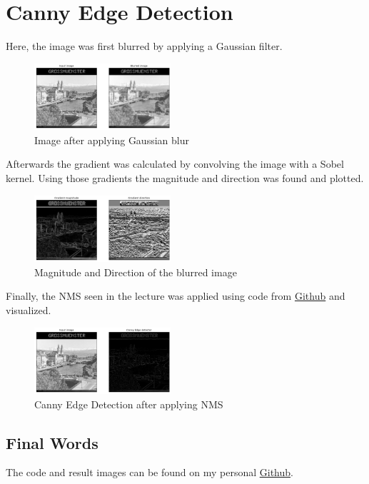 \documentclass{article}
\begin{document}
    \pagebreak

    \section{Canny Edge Detection}

    Here, the image was first blurred by applying a Gaussian filter.

    \begin{figure}[H]
        \centering
        \includegraphics[width = 0.45\textwidth]{canny_blur.png}
        \caption{Image after applying Gaussian blur}
        \label{img:canny_blur}
    \end{figure}

    Afterwards the gradient was calculated by convolving the image with a Sobel kernel.
    Using those gradients the magnitude and direction was found and plotted.

    \begin{figure}[H]
        \centering
        \includegraphics[width = 0.45\textwidth]{canny_magdir.png}
        \caption{Magnitude and Direction of the blurred image}
        \label{img:canny_magdir}
    \end{figure}

    Finally, the NMS seen in the lecture was applied using code from \href{https://github.com/FienSoP/canny_edge_detector}{Github} and visualized.

    \begin{figure}[H]
        \centering
        \includegraphics[width = 0.45\textwidth]{canny_nms.png}
        \caption{Canny Edge Detection after applying NMS}
        \label{img:canny_nms}
    \end{figure}

    \subsection{Final Words}

    The code and result images can be found on my personal \href{https://github.com/danpfister/Bildverarbeitung-FS2022}{Github}.
\end{document}
